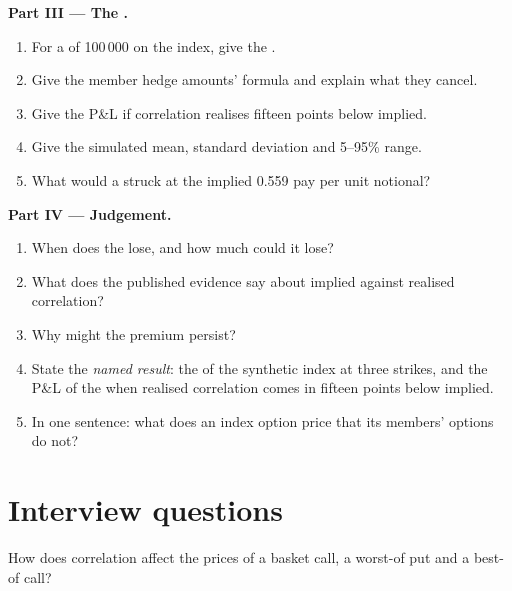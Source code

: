 \begin{problem}
\medskip\noindent\textbf{Part III --- The .}
\begin{enumerate}[resume]
\item For a  of 100\,000 on the index, give the .
\item Give the member hedge amounts' formula and explain what they cancel.
\item Give the P\&L if correlation realises fifteen points below implied.
\item Give the simulated mean, standard deviation and 5--95\% range.
\item What would a  struck at the implied 0.559 pay per unit notional?
\end{enumerate}

\medskip\noindent\textbf{Part IV --- Judgement.}
\begin{enumerate}[resume]
\item When does the  lose, and how much could it lose?
\item What does the published evidence say about implied against realised correlation?
\item Why might the premium persist?
\item State the \emph{named result}: the  of the synthetic index at three strikes, and the P\&L of the
 when realised correlation comes in fifteen points below implied.
\item In one sentence: what does an index option price that its members' options do not?
\end{enumerate}
\end{problem}

\section{Interview questions}

\begin{interviewq}\label{iq:dv:multi-asset-options:1}
How does correlation affect the prices of a basket call, a worst-of put and a best-of call?
\end{interviewq}

